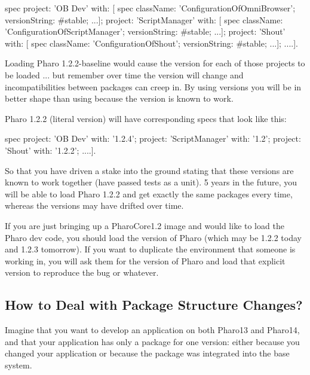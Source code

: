\documentclass[a4paper,10pt,twoside]{book}
\begin{document}
\begin{code}{}
 spec
    project: 'OB Dev' with: [
      spec
         className: 'ConfigurationOfOmniBrowser';
         versionString: #stable;
         ...];
    project: 'ScriptManager' with: [
      spec
         className: 'ConfigurationOfScriptManager';
         versionString: #stable;
         ...];
    project: 'Shout' with: [
      spec
         className: 'ConfigurationOfShout';
         versionString: #stable;
         ...];
    ....].
    
 \end{code}

Loading Pharo 1.2.2-baseline would cause the  version for each of those projects to be loaded ... 
but remember over time the  version will change and incompatibilities between packages can creep in. 
By using  versions you will be in better shape than using  because the  version is known to work.

Pharo 1.2.2 (literal version) will have corresponding specs that look like this:

\begin{code}{}
 spec
    project: 'OB Dev' with: '1.2.4';
    project: 'ScriptManager' with: '1.2';
    project: 'Shout' with: '1.2.2';
    ....].
\end{code}

So that you have driven a stake into the ground stating that these versions are known to work together (have passed tests as a unit). 5 years in the future, you will be able to load Pharo 1.2.2 and get exactly the same packages every time, whereas the  versions may have drifted over time.

If you are just bringing up a PharoCore1.2 image and would like to load the Pharo dev code, you should load the  version of Pharo (which may be 1.2.2 today and 1.2.3 tomorrow).
If you want to duplicate the environment that someone is working in, you will ask them for the version of Pharo and load that explicit version to reproduce the bug or whatever. 


\subsection{How to Deal with Package Structure Changes?}
Imagine that you want to develop an application on both Pharo13 and Pharo14, and that your application has only a package for one version: either because 
you changed your application or because the package was integrated into the base system. 
\end{document}

